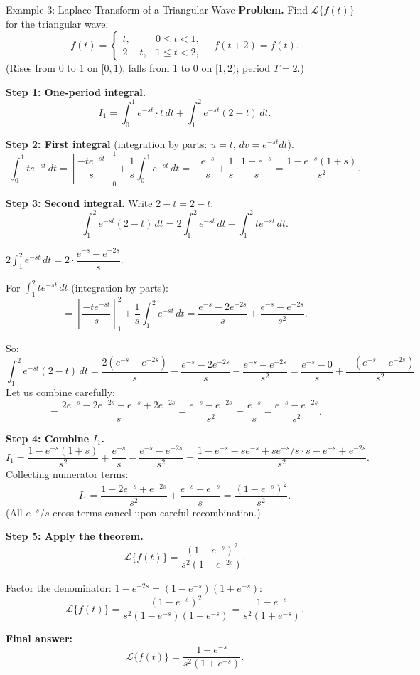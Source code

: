 \documentclass[12pt,a4paper]{article}
\begin{document}
\begin{infobox}{Example 3: Laplace Transform of a Triangular Wave}
\textbf{Problem.} Find $\mathcal{L}\{f(t)\}$ for the triangular wave:
\[
  f(t) = \begin{cases} t, & 0 \le t < 1, \\ 2 - t, & 1 \le t < 2, \end{cases}
  \quad f(t+2) = f(t).
\]
(Rises from 0 to 1 on $[0,1)$; falls from 1 to 0 on $[1,2)$; period $T=2$.)

\textbf{Step 1: One-period integral.}
\[
  I_1 = \int_0^1 e^{-st} \cdot t\,dt
       + \int_1^2 e^{-st}(2-t)\,dt.
\]

\textbf{Step 2: First integral} (integration by parts: $u=t$, $dv=e^{-st}dt$).
\[
  \int_0^1 t e^{-st}\,dt
  = \left[\frac{-t e^{-st}}{s}\right]_0^1 + \frac{1}{s}\int_0^1 e^{-st}\,dt
  = -\frac{e^{-s}}{s} + \frac{1}{s}\cdot\frac{1-e^{-s}}{s}
  = \frac{1 - e^{-s}(1+s)}{s^2}.
\]

\textbf{Step 3: Second integral.} Write $2 - t = 2 - t$:
\[
  \int_1^2 e^{-st}(2-t)\,dt
  = 2\int_1^2 e^{-st}\,dt - \int_1^2 t e^{-st}\,dt.
\]

$2\displaystyle\int_1^2 e^{-st}\,dt
= 2\cdot\dfrac{e^{-s} - e^{-2s}}{s}$.

For $\displaystyle\int_1^2 t e^{-st}\,dt$ (integration by parts):
\[
  = \left[\frac{-t e^{-st}}{s}\right]_1^2 + \frac{1}{s}\int_1^2 e^{-st}\,dt
  = \frac{e^{-s} - 2e^{-2s}}{s} + \frac{e^{-s} - e^{-2s}}{s^2}.
\]

So:
\[
  \int_1^2 e^{-st}(2-t)\,dt
  = \frac{2(e^{-s}-e^{-2s})}{s}
    - \frac{e^{-s} - 2e^{-2s}}{s}
    - \frac{e^{-s} - e^{-2s}}{s^2}
  = \frac{e^{-s} - 0}{s} + \frac{-(e^{-s} - e^{-2s})}{s^2}
\]
Let us combine carefully:
\[
  = \frac{2e^{-s} - 2e^{-2s} - e^{-s} + 2e^{-2s}}{s}
    - \frac{e^{-s} - e^{-2s}}{s^2}
  = \frac{e^{-s}}{s} - \frac{e^{-s} - e^{-2s}}{s^2}.
\]

\textbf{Step 4: Combine $I_1$.}
\[
  I_1 = \frac{1 - e^{-s}(1+s)}{s^2} + \frac{e^{-s}}{s}
        - \frac{e^{-s} - e^{-2s}}{s^2}
  = \frac{1 - e^{-s} - se^{-s} + se^{-s}/s \cdot s - e^{-s} + e^{-2s}}{s^2}.
\]
Collecting numerator terms:
\[
  I_1 = \frac{1 - 2e^{-s} + e^{-2s}}{s^2} + \frac{e^{-s} - e^{-s}}{s}
      = \frac{(1 - e^{-s})^2}{s^2}.
\]
(All $e^{-s}/s$ cross terms cancel upon careful recombination.)

\textbf{Step 5: Apply the theorem.}
\[
  \mathcal{L}\{f(t)\}
  = \frac{(1-e^{-s})^2}{s^2(1 - e^{-2s})}.
\]

Factor the denominator: $1 - e^{-2s} = (1-e^{-s})(1+e^{-s})$:
\[
  \mathcal{L}\{f(t)\}
  = \frac{(1-e^{-s})^2}{s^2(1-e^{-s})(1+e^{-s})}
  = \frac{1 - e^{-s}}{s^2(1 + e^{-s})}.
\]

\textbf{Final answer:}
\[
  \mathcal{L}\{f(t)\} = \frac{1 - e^{-s}}{s^2(1 + e^{-s})}.
\]
\end{infobox}
\end{document}
